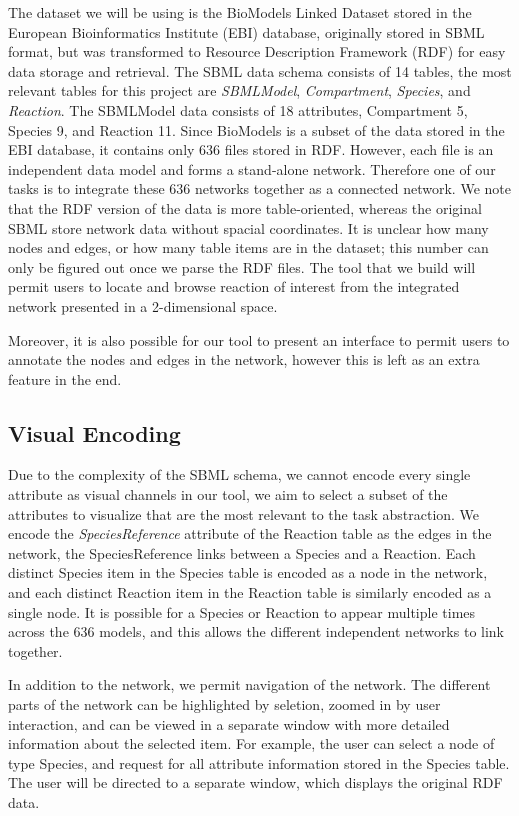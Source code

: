 \documentclass[12pt]{article}
\begin{document}
The dataset we will be using is the BioModels Linked Dataset stored in the European Bioinformatics Institute (EBI) database, originally stored in SBML format, but was transformed to Resource Description Framework (RDF) for easy data storage and retrieval. The SBML data schema consists of 14 tables, the most relevant tables for this project are \emph{SBMLModel}, \emph{Compartment}, \emph{Species}, and \emph{Reaction}. The SBMLModel data consists of 18 attributes, Compartment 5, Species 9, and Reaction 11. Since BioModels is a subset of the data stored in the EBI database, it contains only 636 files stored in RDF. However, each file is an independent data model and forms a stand-alone network. Therefore one of our tasks is to integrate these 636 networks together as a connected network. We note that the RDF version of the data is more table-oriented, whereas the original SBML store network data without spacial coordinates. It is unclear how many nodes and edges, or how many table items are in the dataset; this number can only be figured out once we parse the RDF files. The tool that we build will permit users to locate and browse reaction of interest from the integrated network presented in a 2-dimensional space.

Moreover, it is also possible for our tool to present an interface to permit users to annotate the nodes and edges in the network, however this is left as an extra feature in the end.

\subsection*{Visual Encoding}
Due to the complexity of the SBML schema, we cannot encode every single attribute as visual channels in our tool, we aim to select a subset of the attributes to visualize that are the most relevant to the task abstraction. We encode the \emph{SpeciesReference} attribute of the Reaction table as the edges in the network, the SpeciesReference links between a Species and a Reaction. Each distinct Species item in the Species table is encoded as a node in the network, and each distinct Reaction item in the Reaction table is similarly encoded as a single node. It is possible for a Species or Reaction to appear multiple times across the 636 models, and this allows the different independent networks to link together.

In addition to the network, we permit navigation of the network. The different parts of the network can be highlighted by seletion, zoomed in by user interaction, and can be viewed in a separate window with more detailed information about the selected item. For example, the user can select a node of type Species, and request for all attribute information stored in the Species table. The user will be directed to a separate window, which displays the original RDF data. 
\end{document}
